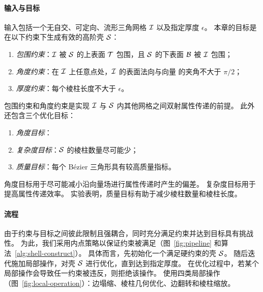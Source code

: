 \paragraph{输入与目标}
输入包括一个无自交、可定向、流形三角网格 $\mathcal{I}$ 以及指定厚度 $\epsilon$。
本章的目标是在以下约束下生成有效的高阶壳 $\mathcal{S}$：
\begin{enumerate}
  \item \emph{包围约束}：$\mathcal{I}$ 被 $\mathcal{S}$ 的上表面 $\mathcal{T}$ 包围，且 $\mathcal{S}$ 的下表面 $\mathcal{B}$ 被 $\mathcal{I}$ 包围；
  \item \emph{角度约束}：在 $\mathcal{I}$ 上任意点处，$\mathcal{I}$ 的表面法向与向量 \tr{$\cF$} 的夹角不大于 $\pi/2$；
  \item \emph{厚度约束}：每个棱柱长度不大于 $\epsilon$。
\end{enumerate}
包围约束和角度约束是实现 $\mathcal{I}$ 与 $\mathcal{S}$ 内其他网格之间双射属性传递的前提。
%
此外还包含三个优化目标：
\begin{enumerate}
  \item \emph{角度目标}：
  \item \emph{复杂度目标}：$\mathcal{S}$ 的棱柱数量尽可能少；
  \item \emph{质量目标}：每个 B\'{e}zier 三角形具有较高质量指标。
\end{enumerate}
角度目标用于尽可能减小沿向量场进行属性传递时产生的偏差。
复杂度目标用于提高属性传递效率。
实验表明，质量目标有助于减少棱柱数量和棱柱长度。



\paragraph{流程}
由于约束与目标之间彼此限制且强耦合，同时充分满足约束并达到目标具有挑战性。
%
为此，我们采用内点策略以保证约束被满足（图~\ref{fig:pipeline} 和算法~\ref{alg:shell-construct}）。
%
具体而言，先初始化一个满足硬约束的壳 $\mathcal{S}$。
随后迭代施加局部操作，对壳 $\mathcal{S}$ 进行优化，直到达到指定厚度。
在优化过程中，若某个局部操作会导致任一约束被违反，则拒绝该操作。
使用四类局部操作（图~\ref{fig:local-operation}）：边塌缩、棱柱几何优化、边翻转和棱柱缩放。
%

